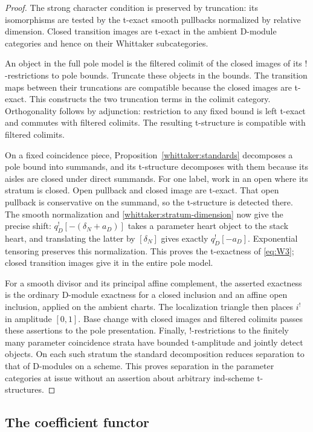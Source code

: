 \begin{proof}
The strong character condition is preserved by truncation: its
isomorphisms are tested by the t-exact smooth pullbacks normalized by
relative dimension. Closed transition images are t-exact in the ambient
D-module categories and hence on their Whittaker subcategories.

An object in the full pole model is the filtered colimit of the closed
images of its $!$-restrictions to pole bounds. Truncate these objects in
the bounds. The transition maps between their truncations are compatible
because the closed images are t-exact. This constructs the two
truncation terms in the colimit category. Orthogonality follows by
adjunction: restriction to any fixed bound is left t-exact and commutes
with filtered colimits. The resulting t-structure is compatible with
filtered colimits.

On a fixed coincidence piece, Proposition~\ref{whittaker:standards}
decomposes a pole bound into summands, and its t-structure decomposes
with them because its aisles are closed under direct summands. For one
label, work in an open where its stratum is closed. Open pullback and
closed image are t-exact. That open pullback is conservative on the
summand, so the t-structure is detected there. The smooth normalization
and \eqref{whittaker:stratum-dimension} now give the precise shift:
$q_D^![-(\delta_N+a_D)]$ takes a parameter heart object to the stack
heart, and translating the latter by $[\delta_N]$ gives exactly
$q_D^![-a_D]$. Exponential tensoring preserves this normalization. This
proves the t-exactness of \eqref{eq:W3}; closed transition images give it
in the entire pole model.

For a smooth divisor and its principal affine complement, the asserted
exactness is the ordinary D-module exactness for a closed inclusion and
an affine open inclusion, applied on the ambient charts. The localization
triangle then places $i^!$ in amplitude $[0,1]$. Base change with closed
images and filtered colimits passes these assertions to the pole
presentation. Finally, $!$-restrictions to the finitely many parameter
coincidence strata have bounded t-amplitude and jointly detect objects.
On each such stratum the standard decomposition reduces separation to
that of D-modules on a scheme. This proves separation in the parameter
categories at issue without an assertion about arbitrary ind-scheme
t-structures.
\end{proof}

\subsection{The coefficient functor}


